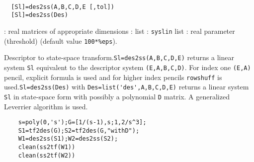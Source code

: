 \begin{mandesc}
   \\ %
\end{mandesc}
\begin{calling_sequence}
\begin{verbatim}
  [Sl]=des2ss(A,B,C,D,E [,tol])  
  [Sl]=des2ss(Des)  
\end{verbatim}
\end{calling_sequence}
\begin{parameters}
  \begin{varlist}
    : real matrices of appropriate dimensions
    : list
    : \verb!syslin! list
    : real parameter (threshold) (default value \verb!100*%eps!).
  \end{varlist}
\end{parameters}
\begin{mandescription}
  Descriptor to state-space transform.\verb!Sl=des2ss(A,B,C,D,E)! returns a
  linear system \verb!Sl! equivalent to the descriptor system
  \verb!(E,A,B,C,D)!.  For index one \verb!(E,A)! pencil, explicit formula is
  used and for higher index pencils \verb!rowshuff! is
  used.\verb!Sl=des2ss(Des)! with \verb!Des=list('des',A,B,C,D,E)! returns a
  linear system \verb!Sl! in state-space form with possibly a polynomial
  \verb!D! matrix.  A generalized Leverrier algorithm is used.
\end{mandescription}
\begin{examples}
  \begin{Verbatim}
    s=poly(0,'s');G=[1/(s-1),s;1,2/s^3];
    S1=tf2des(G);S2=tf2des(G,"withD");
    W1=des2ss(S1);W2=des2ss(S2);
    clean(ss2tf(W1))
    clean(ss2tf(W2))
  \end{Verbatim}
\end{examples}
\begin{manseealso}
      
\end{manseealso}
